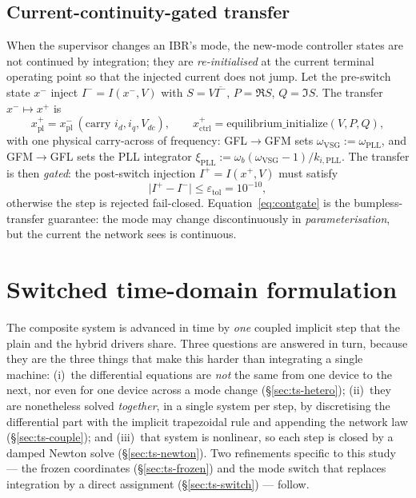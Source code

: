 \documentclass[12pt,a4paper]{article}
\begin{document}
\subsection{Current-continuity-gated transfer}\label{sec:transfer}
When the supervisor changes an IBR's mode, the new-mode controller states are not
continued by integration; they are \emph{re-initialised} at the current terminal
operating point so that the injected current does not jump. Let the pre-switch
state $x^{-}$ inject $I^{-}=I(x^{-},V)$ with $S=V\overline{I^{-}}$,
$P=\Re S$, $Q=\Im S$. The transfer $x^{-}\mapsto x^{+}$ is
\begin{equation}
  x^{+}_{\mathrm{pl}}=x^{-}_{\mathrm{pl}}\ (\text{carry }i_d,i_q,V_{dc}),\qquad
  x^{+}_{\mathrm{ctrl}}=\text{equilibrium\_initialize}(V,P,Q),
  \label{eq:transfer}
\end{equation}
with one physical carry-across of frequency: GFL$\to$GFM sets
$\omega_{\mathrm{VSG}}\!:=\!\omega_{\mathrm{PLL}}$, and GFM$\to$GFL sets the PLL
integrator $\xi_{\mathrm{PLL}}\!:=\!\omega_b(\omega_{\mathrm{VSG}}-1)/k_{i,\mathrm{PLL}}$.
The transfer is then \emph{gated}: the post-switch injection $I^{+}=I(x^{+},V)$
must satisfy
\begin{equation}
  \bigl|I^{+}-I^{-}\bigr|\le\varepsilon_{\mathrm{tol}}=10^{-10},
  \label{eq:contgate}
\end{equation}
otherwise the step is rejected fail-closed. Equation~\eqref{eq:contgate} is the
bumpless-transfer guarantee: the mode may change discontinuously in
\emph{parameterisation}, but the current the network sees is continuous.

\section{Switched time-domain formulation}\label{sec:ts}
The composite system is advanced in time by \emph{one} coupled implicit step
that the plain and the hybrid drivers share. Three questions are answered in
turn, because they are the three things that make this harder than integrating a
single machine: (i)~the differential equations are \emph{not} the same from one
device to the next, nor even for one device across a mode change
(\S\ref{sec:ts-hetero}); (ii)~they are nonetheless solved \emph{together}, in a
single system per step, by discretising the differential part with the implicit
trapezoidal rule and appending the network law (\S\ref{sec:ts-couple}); and
(iii)~that system is nonlinear, so each step is closed by a damped Newton solve
(\S\ref{sec:ts-newton}). Two refinements specific to this study --- the frozen
coordinates (\S\ref{sec:ts-frozen}) and the mode switch that replaces
integration by a direct assignment (\S\ref{sec:ts-switch}) --- follow.
\end{document}
